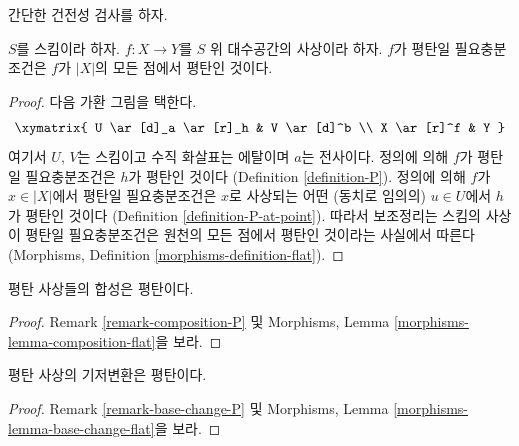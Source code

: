 \noindent
간단한 건전성 검사를 하자.

\begin{lemma}
\label{lemma-flat-is-flat-at-all-points}
$S$를 스킴이라 하자. $f : X \to Y$를 $S$ 위 대수공간의 사상이라 하자.
$f$가 평탄일 필요충분조건은 $f$가 $|X|$의 모든 점에서 평탄인 것이다.
\end{lemma}

\begin{proof}
다음 가환 그림을 택한다.
$$
\xymatrix{
U \ar[d]_a \ar[r]_h & V \ar[d]^b \\
X \ar[r]^f & Y
}
$$
여기서 $U$, $V$는 스킴이고 수직 화살표는 에탈이며 $a$는 전사이다.
정의에 의해 $f$가 평탄일 필요충분조건은 $h$가 평탄인 것이다
(Definition \ref{definition-P}).
정의에 의해 $f$가 $x \in |X|$에서 평탄일 필요충분조건은
$x$로 사상되는 어떤 (동치로 임의의) $u \in U$에서 $h$가 평탄인 것이다
(Definition \ref{definition-P-at-point}).
따라서 보조정리는 스킴의 사상이 평탄일 필요충분조건은 원천의 모든
점에서 평탄인 것이라는 사실에서 따른다
(Morphisms, Definition \ref{morphisms-definition-flat}).
\end{proof}

\begin{lemma}
\label{lemma-composition-flat}
평탄 사상들의 합성은 평탄이다.
\end{lemma}

\begin{proof}
Remark \ref{remark-composition-P} 및 Morphisms, Lemma
\ref{morphisms-lemma-composition-flat}을 보라.
\end{proof}

\begin{lemma}
\label{lemma-base-change-flat}
평탄 사상의 기저변환은 평탄이다.
\end{lemma}

\begin{proof}
Remark \ref{remark-base-change-P} 및 Morphisms, Lemma
\ref{morphisms-lemma-base-change-flat}을 보라.
\end{proof}

